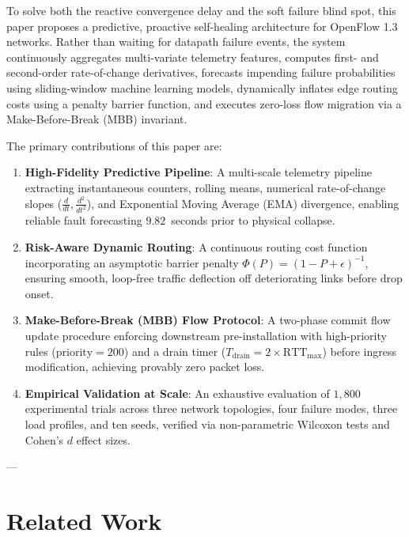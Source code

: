 \documentclass[journal,10pt,twocolumn]{IEEEtran}
\begin{document}
To solve both the reactive convergence delay and the soft failure blind spot, this paper proposes a predictive, proactive self-healing architecture for OpenFlow 1.3 networks. Rather than waiting for datapath failure events, the system continuously aggregates multi-variate telemetry features, computes first- and second-order rate-of-change derivatives, forecasts impending failure probabilities using sliding-window machine learning models, dynamically inflates edge routing costs using a penalty barrier function, and executes zero-loss flow migration via a Make-Before-Break (MBB) invariant.

The primary contributions of this paper are:
\begin{enumerate}
    \item \textbf{High-Fidelity Predictive Pipeline}: A multi-scale telemetry pipeline extracting instantaneous counters, rolling means, numerical rate-of-change slopes ($\frac{d}{dt}, \frac{d^2}{dt^2}$), and Exponential Moving Average (EMA) divergence, enabling reliable fault forecasting $9.82$~seconds prior to physical collapse.
    \item \textbf{Risk-Aware Dynamic Routing}: A continuous routing cost function incorporating an asymptotic barrier penalty $\Phi(P) = (1 - P + \epsilon)^{-1}$, ensuring smooth, loop-free traffic deflection off deteriorating links before drop onset.
    \item \textbf{Make-Before-Break (MBB) Flow Protocol}: A two-phase commit flow update procedure enforcing downstream pre-installation with high-priority rules ($\text{priority}=200$) and a drain timer ($T_{\text{drain}} = 2 \times \text{RTT}_{\max}$) before ingress modification, achieving provably zero packet loss.
    \item \textbf{Empirical Validation at Scale}: An exhaustive evaluation of $1{,}800$ experimental trials across three network topologies, four failure modes, three load profiles, and ten seeds, verified via non-parametric Wilcoxon tests and Cohen's $d$ effect sizes.
\end{enumerate}

---

\section{Related Work}
\label{sec:related}
\end{document}
